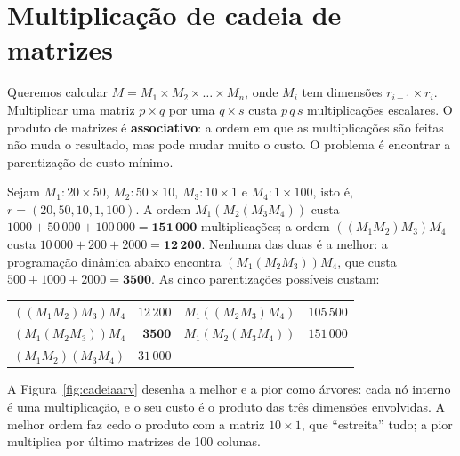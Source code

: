\section{Multiplicação de cadeia de matrizes}\label{sec:cadeia}
Queremos calcular $M=M_1\times M_2\times\dots\times M_n$, onde $M_i$ tem dimensões $r_{i-1}\times r_i$. Multiplicar uma matriz $p\times q$ por uma $q\times s$ custa $p\,q\,s$ multiplicações escalares. O produto de matrizes é \textbf{associativo}: a ordem em que as multiplicações são feitas não muda o resultado, mas pode mudar muito o custo. O problema é encontrar a parentização de custo mínimo.

\begin{exemplo}\label{ex:cadeia}
Sejam $M_1:20\times50$, $M_2:50\times10$, $M_3:10\times1$ e $M_4:1\times100$, isto é, $r=(20,50,10,1,100)$. A ordem $M_1(M_2(M_3M_4))$ custa $1000+50\,000+100\,000=\mathbf{151\,000}$ multiplicações; a ordem $((M_1M_2)M_3)M_4$ custa $10\,000+200+2000=\mathbf{12\,200}$. Nenhuma das duas é a melhor: a programação dinâmica abaixo encontra $(M_1(M_2M_3))M_4$, que custa $500+1000+2000=\mathbf{3500}$. As cinco parentizações possíveis custam:
\begin{center}\small
\begin{tabular}{@{}lr@{\qquad}lr@{}}
\toprule
$((M_1M_2)M_3)M_4$ & $12\,200$ & $M_1((M_2M_3)M_4)$ & $105\,500$\\
$(M_1(M_2M_3))M_4$ & $\mathbf{3500}$ & $M_1(M_2(M_3M_4))$ & $151\,000$\\
$(M_1M_2)(M_3M_4)$ & $31\,000$ & & \\
\bottomrule
\end{tabular}
\end{center}
A Figura~\ref{fig:cadeiaarv} desenha a melhor e a pior como árvores: cada nó interno é uma multiplicação, e o seu custo é o produto das três dimensões envolvidas. A melhor ordem faz cedo o produto com a matriz $10\times1$, que ``estreita'' tudo; a pior multiplica por último matrizes de 100 colunas.
\begin{figura}[A melhor (à esquerda) e a pior (à direita) parentização de $M_1M_2M_3M_4$, com $r=(20,50,10,1,100)$. Cada nó interno mostra as dimensões do resultado e, em vermelho, o custo daquela multiplicação; o custo total é a soma dos números vermelhos.\label{fig:cadeiaarv}]
\end{figura}
\end{exemplo}

